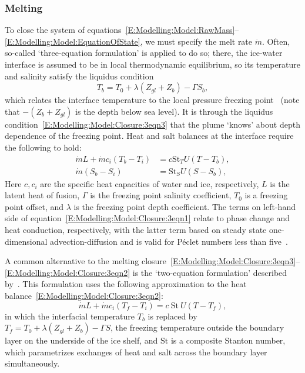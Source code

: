 \documentclass[openacc]{rsproca_new}%
\begin{document}
\begin{table}[!h]
\begin{center}
\begin{tabular}{llll}
\hline
\end{tabular}
\end{center}
\vspace*{-4pt}
\end{table}

\subsubsection{Melting}
To close the system of equations~\eqref{E:Modelling:Model:RawMass}--\eqref{E:Modelling:Model:EquationOfState}, we must specify the melt rate $\dot{m}$.  Often,  so-called `three-equation formulation' is applied to do so; there, the ice-water interface is assumed to be in local thermodynamic equilibrium, so its temperature and salinity satisfy the liquidus condition 
\begin{equation}
    T_b = T_0 + \lambda (Z_{gl} + Z_b) - \Gamma S_b,\label{E:Modelling:Model:Closure:3eqn3}
\end{equation}
which relates the interface temperature to the local pressure freezing point~\citep{Holland1999JPhysOcean} (note that $-(Z_b + Z_{gl})$ is the depth below sea level). It is through the liquidus condition~\eqref{E:Modelling:Model:Closure:3eqn3} that the plume `knows' about depth dependence of the freezing point. Heat and salt balances at the interface require the following to hold:
\begin{align}
\dot{m}L + \dot{m}c_i (T_b - T_i) &= c \mathrm{St}_T U(T - T_b),\label{E:Modelling:Model:Closure:3eqn1}\\
\dot{m}(S_b - S_i) &= \mathrm{St}_S U(S - S_b),\label{E:Modelling:Model:Closure:3eqn2}
\end{align}  
Here $c, c_i$ are the specific heat capacities of water and ice, respectively, $L$ is the latent heat of fusion, $\Gamma$ is the freezing point salinity coefficient,  $T_0$ is a freezing point offset, and $\lambda$ is the freezing point depth coefficient. The terms on left-hand side of equation~\eqref{E:Modelling:Model:Closure:3eqn1} relate to phase change and heat conduction, respectively, with the latter term based on steady state one-dimensional advection-diffusion and is valid for P\'{e}clet numbers less than five~\citep{Holland1999JPhysOcean}.

A common alternative to the melting closure~\eqref{E:Modelling:Model:Closure:3eqn3}--\eqref{E:Modelling:Model:Closure:3eqn2} is the `two-equation formulation' described by~\citet{McPhee1992JGeophysResOcean}. This formulation uses the following approximation to the heat balance~\eqref{E:Modelling:Model:Closure:3eqn2}:
\begin{equation}
\dot{m}L + \dot{m}c_i (T_f - T_i) = c~ \mathrm{St} ~U(T - T_f),\label{E:Modelling:Model:Closure:2eqn1}
\end{equation}
in which the interfacial temperature $T_b$ is replaced by $T_f =T_0 + \lambda (Z_{gl} + Z_b) - \Gamma S$, the freezing temperature outside the boundary layer on the underside of the ice shelf, and $\mathrm{St}$ is a composite Stanton number, which parametrizes exchanges of heat and salt across the boundary layer simultaneously.
\end{document}
